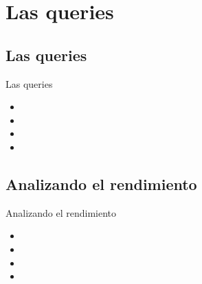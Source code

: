\section{Las queries}

\subsection{Las queries}
\begin{frame}{Las queries}
  \begin{itemize}
    \item 
    \item 
    \item 
    \item 
  \end{itemize}
\end{frame}

\subsection{Analizando el rendimiento}
\begin{frame}{Analizando el rendimiento}
  \begin{itemize}
    \item 
    \item 
    \item 
    \item 
  \end{itemize}
\end{frame}
